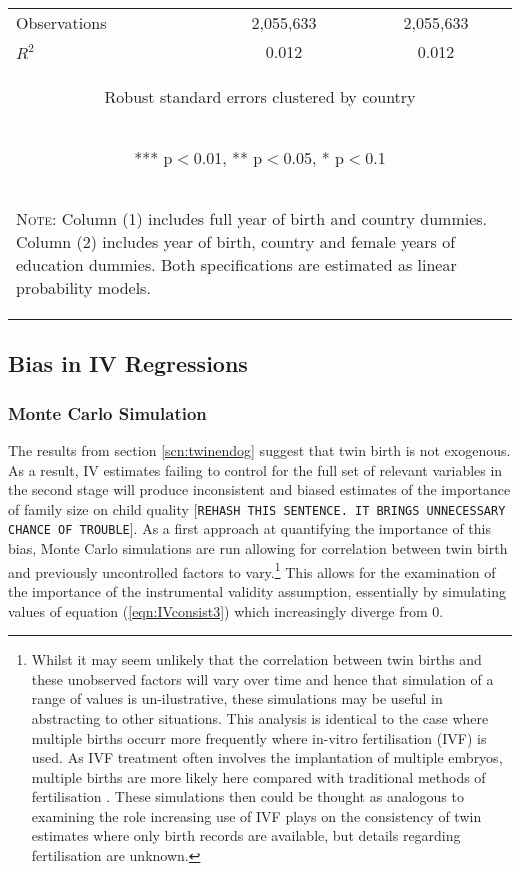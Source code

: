 \documentclass{article}[11pt,subeqn]
\begin{document}
\begin{spacing}{1.25}
\begin{table}[ht]
\begin{center}
\begin{tabular}{lcc}
Observations & 2,055,633 & 2,055,633 \\
 $R^2$ & 0.012 & 0.012 \\ \midrule
\multicolumn{3}{c}{\begin{footnotesize} Robust standard errors clustered by country \end{footnotesize}} \\
\multicolumn{3}{c}{\begin{footnotesize} *** p$<$0.01, ** p$<$0.05, * p$<$0.1\end{footnotesize}} \\
\bottomrule
\multicolumn{3}{p{7.2cm}}{\setstretch{0.9}\begin{footnotesize}\textsc{Note:} Column (1) includes full year of birth and country
dummies.  Column (2) includes year of birth, country and female years of education dummies.  Both specifications are estimated
as linear probability models.\end{footnotesize}}\\
\end{tabular}
\end{center}
\end{table}
\subsection{Bias in IV Regressions}
\label{scn:bias}
\subsubsection{Monte Carlo Simulation}
\label{scn:MCS}
The results from section \ref{scn:twinendog} suggest that twin birth is not exogenous. As a result, IV estimates failing to control for the full set of 
relevant variables in the second stage will produce inconsistent and biased estimates of the importance of family size on child quality [\texttt{REHASH THIS SENTENCE.  IT BRINGS UNNECESSARY CHANCE OF TROUBLE}].  As a first approach at quantifying the importance of this bias, Monte Carlo simulations are run allowing for correlation between twin birth and previously uncontrolled factors
to vary.\footnote{Whilst it may seem unlikely that the correlation between twin births and these unobserved factors will vary over time and hence that
simulation of a range of values is un-ilustrative, these simulations may be useful in abstracting to other situations.  This analysis is identical to the
case where multiple births occurr more frequently where in-vitro fertilisation (IVF) is used.  As IVF treatment often involves the implantation of 
multiple embryos, multiple births are more likely here compared with traditional methods of fertilisation \citep{Beraletal1990}.  These simulations then could be 
thought as analogous to examining the role increasing use of IVF plays on the consistency of twin estimates where only birth records are available, 
but details regarding fertilisation are unknown.}  This allows for the examination of the importance of the instrumental validity assumption, essentially
by simulating values of equation (\ref{eqn:IVconsist3}) which increasingly diverge from 0. 


\end{spacing}
\end{document}
